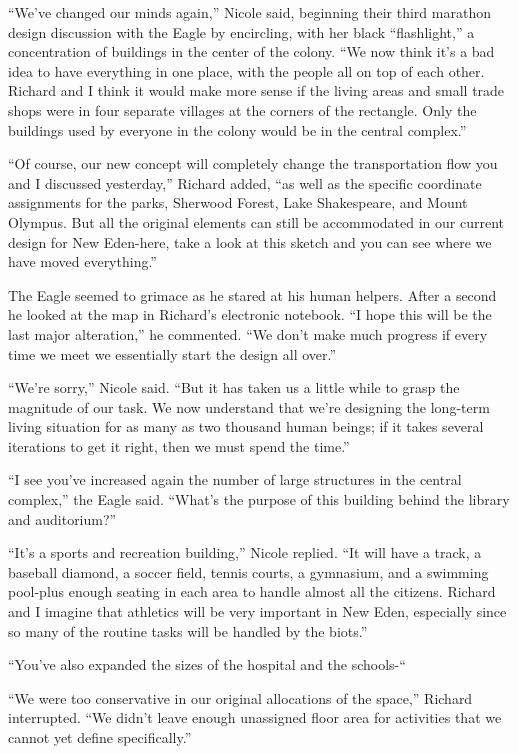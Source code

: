 \documentclass[]{article}
\begin{document}
{“We’ve changed our minds again,” Nicole said, beginning their third marathon design discussion with the Eagle by encircling, with her black “flashlight,” a concentration of buildings in the center of the colony.  “We now think it’s a bad idea to have everything in one place, with the people all on top of each other.  Richard and I think it would make more sense if the living areas and small trade shops were in four separate villages at the corners of the rectangle.  Only the buildings used by everyone in the colony would be in the central complex.”

“Of course, our new concept will completely change the transportation flow you and I discussed yesterday,” Richard added, “as well as the specific coordinate assignments for the parks, Sherwood Forest, Lake Shakespeare, and Mount Olympus.  But all the original elements can still be accommodated in our current design for New Eden-here, take a look at this sketch and you can see where we have moved everything.”

The Eagle seemed to grimace as he stared at his human helpers.  After a second he looked at the map in Richard’s electronic notebook.  “I hope this will be the last major alteration,” he commented.  “We don’t make much progress if every time we meet we essentially start the design all over.”

“We’re sorry,” Nicole said.  “But it has taken us a little while to grasp the magnitude of our task.  We now understand that we’re designing the long-term living situation for as many as two thousand human beings; if it takes several iterations to get it right, then we must spend the time.”

“I see you’ve increased again the number of large structures in the central complex,” the Eagle said.  “What’s the purpose of this building behind the library and auditorium?”

“It’s a sports and recreation building,” Nicole replied.  “It will have a track, a baseball diamond, a soccer field, tennis courts, a gymnasium, and a swimming pool-plus enough seating in each area to handle almost all the citizens.  Richard and I imagine that athletics will be very important in New Eden, especially since so many of the routine tasks will be handled by the biots.”

“You’ve also expanded the sizes of the hospital and the schools-“

“We were too conservative in our original allocations of the space,” Richard interrupted.  “We didn’t leave enough unassigned floor area for activities that we cannot yet define specifically.”

}
\end{document}

